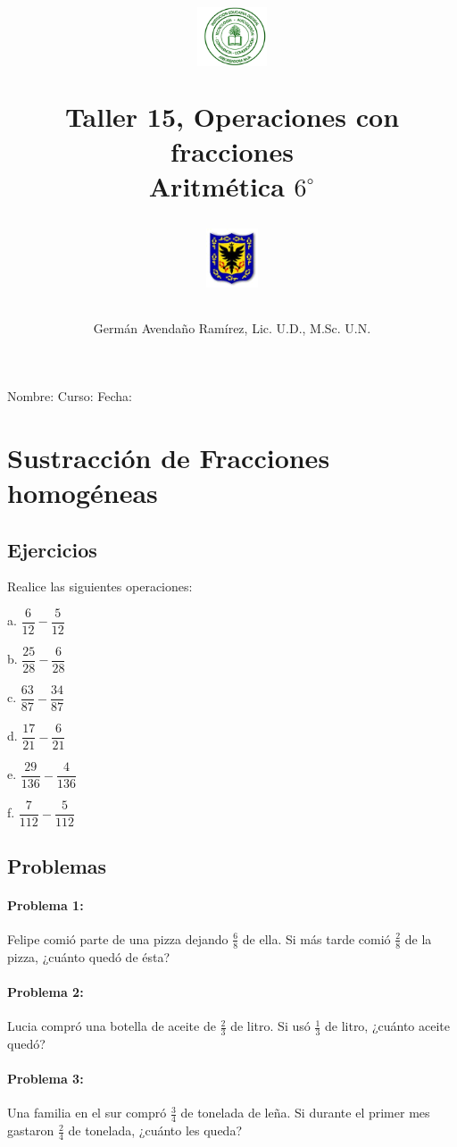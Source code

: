 \documentclass[10pt,twoside]{article}
\author{Germ\'an Avenda\~no Ram\'irez, Lic. U.D., M.Sc. U.N.}
\title{\begin{minipage}{.2\textwidth}
\includegraphics[height=1.75cm]{Images/logo-colegio.png}\end{minipage}
\begin{minipage}{.55\textwidth}
\begin{center}
Taller 15, Operaciones con fracciones\\
Aritmética $6^{\circ}$
\end{center}
\end{minipage}\hfill
\begin{minipage}{.2\textwidth}
\includegraphics[height=1.75cm]{Images/logo-sed.png} 
\end{minipage}}
\date{}
\begin{document}
\maketitle
Nombre: \hrulefill Curso: \underline{\hspace*{44pt}} Fecha: \underline{\hspace*{2.5cm}}
\section*{Sustracción de Fracciones homog\'{e}neas}
\subsection*{Ejercicios}
Realice las siguientes operaciones:
\begin{enumerate}
\begin{multicols}{3}
\item[a.] $\dfrac{6}{12}-\dfrac{5}{12}$
\item[b.] $\dfrac{25}{28}-\dfrac{6}{28}$
\item[c.] $\dfrac{63}{87}-\dfrac{34}{87}$
\item[d.] $\dfrac{17}{21}-\dfrac{6}{21}$
\item[e.] $\dfrac{29}{136}-\dfrac{4}{136}$
\item[f.] $\dfrac{7}{112}-\dfrac{5}{112}$
\end{multicols}
\end{enumerate}
\subsection*{Problemas}
\paragraph*{Problema 1:} Felipe comi\'{o} parte de una pizza dejando $\frac{6}{8}$ de ella. Si m\'{a}s tarde comi\'{o} $\frac{2}{8}$ de la pizza, ¿cu\'{a}nto qued\'{o} de \'{e}sta?
\paragraph*{Problema 2:}
Lucia compró una botella de aceite de $\frac{2}{3}$ de litro. Si usó $\frac{1}{3}$ de litro, ¿cuánto aceite quedó?
\paragraph*{Problema 3:} Una familia en el sur compr\'{o} $\frac{3}{4}$ de tonelada de leña. Si durante el primer mes gastaron $\frac{2}{4}$ de tonelada, ¿cuánto les queda?
\end{document}
